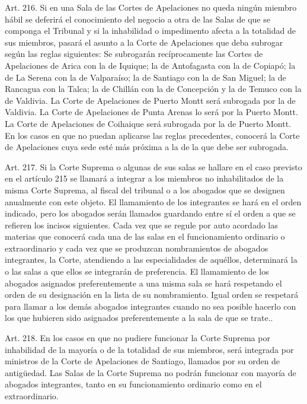     Art. 216. Si en una Sala de las Cortes de Apelaciones no queda ningún miembro hábil se deferirá el conocimiento del negocio a otra de las Salas de que se componga el Tribunal y si la inhabilidad o impedimento afecta a la totalidad de sus miembros, pasará el asunto a la Corte de Apelaciones que deba subrogar según las reglas siguientes:
    Se subrogarán recíprocamente las Cortes de Apelaciones de Arica con la de Iquique; la de Antofagasta con la de Copiapó; la de La Serena con la de Valparaíso; la de Santiago con la de San Miguel; la de Rancagua con la Talca; la de Chillán con la de Concepción y la de Temuco con la de Valdivia.
    La Corte de Apelaciones de Puerto Montt será subrogada por la de Valdivia.
    La Corte de Apelaciones de Punta Arenas lo será por la Puerto Montt.
    La Corte de Apelaciones de Coihaique será subrogada por la de Puerto Montt.
    En los casos en que no puedan aplicarse las reglas precedentes, conocerá la Corte de Apelaciones cuya sede esté más próxima a la de la que debe ser subrogada.


    Art. 217. Si la Corte Suprema o algunas de sus salas se hallare en el caso previsto en el artículo 215 se llamará a integrar a los miembros no inhabilitados de la misma Corte Suprema, al fiscal del tribunal o a los abogados que se designen anualmente con este objeto.
    El llamamiento de los integrantes se hará en el orden indicado, pero los abogados serán llamados guardando entre sí el orden a que se refieren los incisos siguientes.
    Cada vez que se regule por auto acordado las materias que conocerá cada una de las salas en el funcionamiento ordinario o extraordinario y cada vez que se produzcan nombramientos de abogados integrantes, la Corte, atendiendo a las especialidades de aquéllos, determinará la o las salas a que ellos se integrarán de preferencia.
    El llamamiento de los abogados asignados preferentemente a una misma sala se hará respetando el orden de su designación en la lista de su nombramiento. Igual orden se respetará para llamar a los demás abogados integrantes cuando no sea posible hacerlo con los que hubieren sido asignados preferentemente a la sala de que se trate..



    Art. 218. En los casos en que no pudiere funcionar la Corte Suprema por inhabilidad de la mayoría o de la totalidad de sus miembros, será integrada por ministros de la Corte de Apelaciones de Santiago, llamados por su orden de antigüedad.
    Las Salas de la Corte Suprema no podrán funcionar con mayoría de abogados integrantes, tanto en su funcionamiento ordinario como en el extraordinario.




